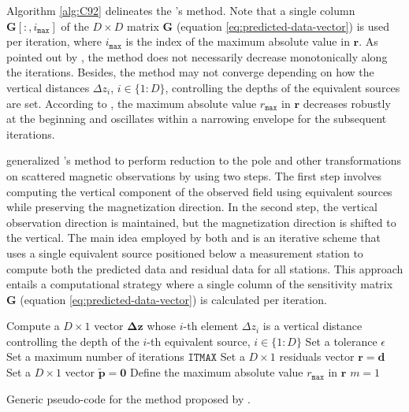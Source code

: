 Algorithm \ref{alg:C92} delineates the \citeauthor{cordell1992}'s method.
Note that a single column $\mathbf{G}[:, i_{\mathtt{max}}]$ of the $D \times D$ matrix $\mathbf{G}$ (equation \ref{eq:predicted-data-vector})
is used per iteration, where $i_{\mathtt{max}}$ is the index of the maximum absolute value in $\mathbf{r}$.
As pointed out by \cite{cordell1992}, the method does not necessarily decrease monotonically along the iterations.
Besides, the method may not converge depending on how the vertical distances $\Delta z_{i}$, $i \in \{1:D\}$, 
controlling the depths of the equivalent sources are set.
According to \cite{cordell1992}, the maximum absolute value $r_{\mathtt{max}}$ in $\mathbf{r}$ decreases robustly at the beginning 
and oscillates within a narrowing envelope for the subsequent iterations.

\cite{guspi-novara2009} generalized \citeauthor{cordell1992}'s method to
perform reduction to the pole and other transformations on scattered magnetic observations by using two steps. 
The first step involves computing the vertical component of the observed field using equivalent sources while preserving the magnetization direction.
In the second step, the vertical observation direction is maintained, but the magnetization direction is shifted to the vertical.
The main idea employed by both \cite{cordell1992} and \cite{guspi-novara2009} is an iterative scheme that 
uses a single equivalent source positioned below a measurement station to compute both the predicted data and residual data for all stations. 
This approach entails a computational strategy where a single column of the sensitivity matrix $\mathbf{G}$ (equation \ref{eq:predicted-data-vector}) 
is calculated per iteration.


\begin{algorithm}
	\Input{}
	Compute a $D \times 1$ vector $\boldsymbol{\Delta}\mathbf{z}$ whose $i$-th element $\Delta z_{i}$ 
	is a vertical distance controlling the depth of the $i$-th equivalent source, $i \in \{1:D\}$ \;
	Set a tolerance $\epsilon$ \;
	Set a maximum number of iterations $\mathtt{ITMAX}$ \;
	Set a $D \times 1$ residuals vector $\mathbf{r} = \mathbf{d}$ \;
	Set a $D \times 1$ vector $\tilde{\mathbf{p}} = \mathbf{0}$ \;
	Define the maximum absolute value $r_{\mathtt{max}}$ in $\mathbf{r}$ \;
	$m = 1$ \;
	\caption{Generic pseudo-code for the method proposed by \cite{cordell1992}.}
	\label{alg:C92}
\end{algorithm}

